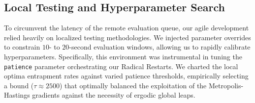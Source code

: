 \documentclass[11pt]{article}
\begin{document}
\subsection{Local Testing and Hyperparameter Search}
To circumvent the latency of the remote evaluation queue, our agile development relied heavily on localized testing methodologies. We injected parameter overrides to constrain $10$- to $20$-second evaluation windows, allowing us to rapidly calibrate hyperparameters. Specifically, this environment was instrumental in tuning the \texttt{patience} parameter orchestrating our Radical Restarts. We charted the local optima entrapment rates against varied patience thresholds, empirically selecting a bound ($\tau \approx 2500$) that optimally balanced the exploitation of the Metropolis-Hastings gradients against the necessity of ergodic global leaps.
\end{document}
